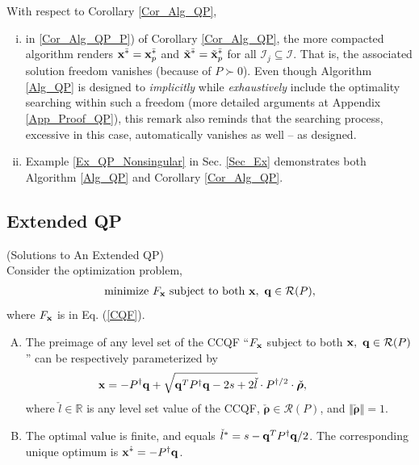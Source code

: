 \documentclass{imaman}
\newcommand{\beq}{\begin{eqnarray}}
\newcommand{\eeq}{\end{eqnarray}}
\newcommand{\bfx}{{\bf x}}
\newcommand{\bfq}{{\bf q}}
\newcommand{\bfrho}{{\boldsymbol \rho}}
\newcommand{\real}{\mathbb{R}}
\newcommand{\calI}{{\mathcal I}}
\newcommand{\calR}{{\mathcal R}}
\numberwithin{equation}{section}
\begin{document}
\begin{remark} With respect to Corollary \ref{Cor_Alg_QP},
\begin{enumerate}[i)]
\item\label{Rem_Cor_Alg_P_Nonsingular} in \ref{Cor_Alg_QP_P}) of Corollary \ref{Cor_Alg_QP}, the more compacted algorithm renders $\bfx^{\bar *}=\bfx_p^{\bar *}$ and $\tilde\bfx^{\bar *}=\tilde\bfx_p^{\bar *}$ for all $\calI_j\subseteq\calI$. That is, the associated solution freedom vanishes (because of $P\succ 0$). Even though Algorithm \ref{Alg_QP} is designed to \textit{implicitly} while \textit{exhaustively} include the optimality searching within such a freedom (more detailed arguments at Appendix \ref{App_Proof_QP}), this remark also reminds that the searching process, excessive in this case, automatically vanishes as well -- as designed.
\item Example \ref{Ex_QP_Nonsingular} in Sec. \ref{Sec_Ex} demonstrates both Algorithm \ref{Alg_QP} and Corollary \ref{Cor_Alg_QP}.
\end{enumerate}
\label{Rem_Cor_Alg}
\end{remark}

\subsection{Extended QP}
\label{Subsec_Extended_QP}
\begin{theorem} (Solutions to An Extended QP)\\
Consider the optimization problem,
\beq
\mbox{minimize}~F_\bfx~\mbox{subject to both}~\bfx,~\bfq\in\calR(P),
\label{Problem_Extended_QP}
\eeq
where $F_\bfx$ is in Eq. {\rm(\ref{CQF})}.
\begin{enumerate}[A)]
\item\label{Thm_Extended_QP_Preimage} The preimage of any level set of the CCQF ``$F_\bfx$ subject to both $\bfx,~\bfq\in\calR(P)$'' can be respectively parameterized by
    \beq
    \bfx=-P^{\dagger}\bfq+\sqrt{\bfq^TP^\dagger\bfq-2s+2\check l}\cdot P^{\dagger/2}\cdot \check \bfrho,~~~~~~~~~
    \label{Thm_Extended_QP_Solutions}
    \eeq
    where $\check l\in\real$ is any level set value of the CCQF, $\check\bfrho\in \calR(P)$, and $\Vert\check\bfrho\Vert=1$.
\item\label{Thm_Extended_QP_Optimality} The optimal value is finite, and equals $\check l^*=s-\bfq^TP^\dagger\bfq/2$. The corresponding unique optimum is $\bfx^{\hat *}=-P^\dagger\bfq$.
\end{enumerate}
\label{Thm_Extended_QP}
\end{theorem}
\end{document}
